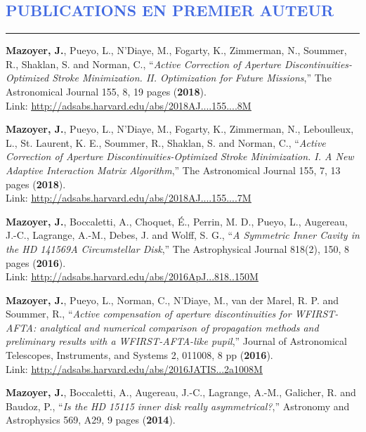 \documentclass[11pt,a4paper, french]{article}
\begin{document}
\vspace{-0.7cm}
\textcolor{RoyalBlue}{\section{\large PUBLICATIONS EN PREMIER AUTEUR}
\vspace{-0.2cm}\hrule}
\vspace{0.4cm}

\begin{etaremune}

\item \textbf{Mazoyer, J.}, Pueyo, L., N’Diaye, M., Fogarty, K., Zimmerman, N., Soummer, R., Shaklan, S. and Norman, C., “\textit{Active Correction of Aperture Discontinuities-Optimized Stroke Minimization. II. Optimization for Future Missions},” The Astronomical Journal 155, 8, 19 pages (\textbf{2018}).\\
Link: \textcolor{BrickRed}{\underline{\url{http://adsabs.harvard.edu/abs/2018AJ....155....8M}}}
\item \textbf{Mazoyer, J.}, Pueyo, L., N’Diaye, M., Fogarty, K., Zimmerman, N., Leboulleux, L., St. Laurent, K. E., Soummer, R., Shaklan, S. and Norman, C., “\textit{Active Correction of Aperture Discontinuities-Optimized Stroke Minimization. I. A New Adaptive Interaction Matrix Algorithm},” The Astronomical Journal 155, 7, 13 pages (\textbf{2018}).\\
Link: \textcolor{BrickRed}{\underline{\url{http://adsabs.harvard.edu/abs/2018AJ....155....7M}}}
\item \textbf{Mazoyer, J.}, Boccaletti, A., Choquet, É., Perrin, M. D., Pueyo, L., Augereau, J.-C., Lagrange, A.-M., Debes, J. and Wolff, S. G., “\textit{A Symmetric Inner Cavity in the HD 141569A Circumstellar Disk},” The Astrophysical Journal 818(2), 150, 8 pages (\textbf{2016}).\\
Link: \textcolor{BrickRed}{\underline{\url{http://adsabs.harvard.edu/abs/2016ApJ...818..150M}}}
\item \textbf{Mazoyer, J.}, Pueyo, L., Norman, C., N’Diaye, M., van der Marel, R. P. and Soummer, R., “\textit{Active compensation of aperture discontinuities for WFIRST-AFTA: analytical and numerical comparison of propagation methods and preliminary results with a WFIRST-AFTA-like pupil},” Journal of Astronomical Telescopes, Instruments, and Systems 2, 011008, 8 pp (\textbf{2016}).\\
Link: \textcolor{BrickRed}{\underline{\url{http://adsabs.harvard.edu/abs/2016JATIS...2a1008M}}}
\item \textbf{Mazoyer, J.}, Boccaletti, A., Augereau, J.-C., Lagrange, A.-M., Galicher, R. and Baudoz, P., “\textit{Is the HD 15115 inner disk really asymmetrical?},” Astronomy and Astrophysics 569, A29, 9 pages (\textbf{2014}).\\

\end{etaremune}
\end{document}
